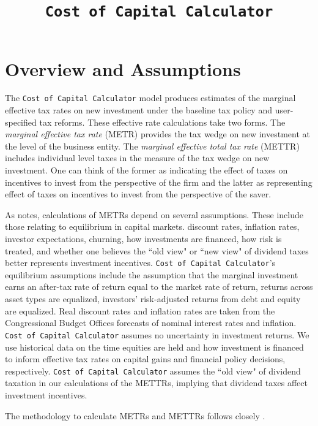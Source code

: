 \documentclass[article,11pt,letterpaper,fleqn]{article}
\title{\texttt{Cost of Capital Calculator}}
\date{}
\theoremstyle{definition}
\numberwithin{equation}{section}
\newcommand{\cn}{\citeasnoun} %
\begin{document}

\maketitle


\section*{Overview and Assumptions}

The \texttt{Cost of Capital Calculator} model produces estimates of the marginal effective tax rates on new investment under the baseline tax policy and user-specified tax reforms.  These effective rate calculations take two forms.  The \emph{marginal effective tax rate} (METR) provides the tax wedge on new investment at the level of the business entity.  The \emph{marginal effective total tax rate} (METTR) includes individual level taxes in the measure of the tax wedge on new investment.  One can think of the former as indicating the effect of taxes on incentives to invest from the perspective of the firm and the latter as representing effect of taxes on incentives to invest from the perspective of the saver.

As \cn{FullertonMETR} notes, calculations of METRs depend on several assumptions.  These include those relating to equilibrium in capital markets. discount rates, inflation rates, investor expectations, churning, how investments are financed, how risk is treated, and whether one believes the ``old view" or ``new view" of dividend taxes better represents investment incentives.  \texttt{Cost of Capital Calculator}'s equilibrium assumptions include the assumption that the marginal investment earns an after-tax rate of return equal to the market rate of return, returns across asset types are equalized, investors' risk-adjusted returns from debt and equity are equalized.  Real discount rates and inflation rates are taken from the Congressional Budget Offices forecasts of nominal interest rates and inflation.  \texttt{Cost of Capital Calculator} assumes no uncertainty in investment returns.  We use historical data on the time equities are held and how investment is financed to inform effective tax rates on capital gains and financial policy decisions, respectively.  \texttt{Cost of Capital Calculator} assumes the ``old view" of dividend taxation in our calculations of the METTRs, implying that dividend taxes affect investment incentives.  

The methodology to calculate METRs and METTRs follows closely \cn{CBO_ETRs}.
\end{document}
